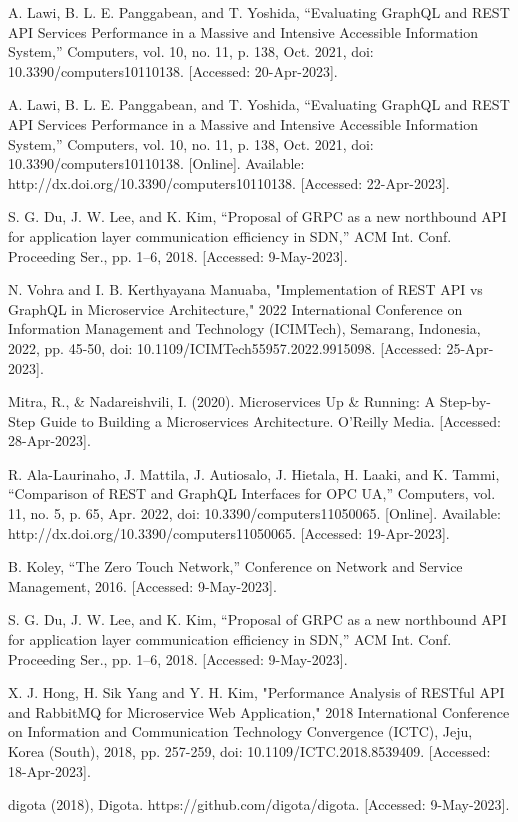 \begin{thebibliography}{30}

{A. Lawi, B. L. E. Panggabean, and T. Yoshida, “Evaluating GraphQL and REST API Services Performance in a Massive and Intensive Accessible Information System,” Computers, vol. 10, no. 11, p. 138, Oct. 2021, doi: 10.3390/computers10110138. [Accessed: 20-Apr-2023].}

{A. Lawi, B. L. E. Panggabean, and T. Yoshida, “Evaluating GraphQL and REST API Services Performance in a Massive and Intensive Accessible Information System,” Computers, vol. 10, no. 11, p. 138, Oct. 2021, doi: 10.3390/computers10110138. [Online]. Available: http://dx.doi.org/10.3390/computers10110138. [Accessed: 22-Apr-2023].}

{S. G. Du, J. W. Lee, and K. Kim, “Proposal of GRPC as a new northbound API for application layer communication efficiency in SDN,” ACM Int. Conf. Proceeding Ser., pp. 1–6, 2018. [Accessed: 9-May-2023].}

{N. Vohra and I. B. Kerthyayana Manuaba, "Implementation of REST API vs GraphQL in Microservice Architecture," 2022 International Conference on Information Management and Technology (ICIMTech), Semarang, Indonesia, 2022, pp. 45-50, doi: 10.1109/ICIMTech55957.2022.9915098. [Accessed: 25-Apr-2023].}

{Mitra, R., \& Nadareishvili, I. (2020). Microservices Up \& Running: A Step-by-Step Guide to Building a Microservices Architecture. O'Reilly Media. [Accessed: 28-Apr-2023].}

{R. Ala-Laurinaho, J. Mattila, J. Autiosalo, J. Hietala, H. Laaki, and K. Tammi, “Comparison of REST and GraphQL Interfaces for OPC UA,” Computers, vol. 11, no. 5, p. 65, Apr. 2022, doi: 10.3390/computers11050065. [Online]. Available: http://dx.doi.org/10.3390/computers11050065. [Accessed: 19-Apr-2023].}

{B. Koley, “The Zero Touch Network,” Conference on Network and Service Management, 2016. [Accessed: 9-May-2023].}

{S. G. Du, J. W. Lee, and K. Kim, “Proposal of GRPC as a new northbound API for application layer communication efficiency in SDN,” ACM Int. Conf. Proceeding Ser., pp. 1–6, 2018. [Accessed: 9-May-2023].}

{X. J. Hong, H. Sik Yang and Y. H. Kim, "Performance Analysis of RESTful API and RabbitMQ for Microservice Web Application," 2018 International Conference on Information and Communication Technology Convergence (ICTC), Jeju, Korea (South), 2018, pp. 257-259, doi: 10.1109/ICTC.2018.8539409. [Accessed: 18-Apr-2023].}

{digota (2018), Digota. https://github.com/digota/digota. [Accessed: 9-May-2023].}


\end{thebibliography}